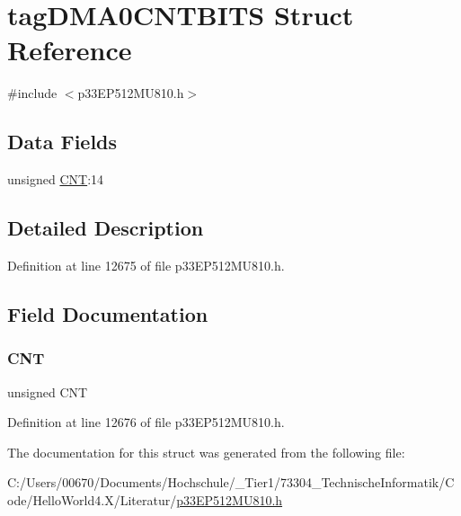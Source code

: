 \hypertarget{structtag_d_m_a0_c_n_t_b_i_t_s}{}\section{tag\+D\+M\+A0\+C\+N\+T\+B\+I\+TS Struct Reference}
\label{structtag_d_m_a0_c_n_t_b_i_t_s}


{\ttfamily \#include $<$p33\+E\+P512\+M\+U810.\+h$>$}

\subsection*{Data Fields}
\begin{DoxyCompactItemize}
\item 
unsigned \hyperlink{structtag_d_m_a0_c_n_t_b_i_t_s_a30be39d82c244f19fd98dd74227487f6}{C\+NT}\+:14
\end{DoxyCompactItemize}


\subsection{Detailed Description}


Definition at line 12675 of file p33\+E\+P512\+M\+U810.\+h.



\subsection{Field Documentation}
\mbox{\label{structtag_d_m_a0_c_n_t_b_i_t_s_a30be39d82c244f19fd98dd74227487f6}} 
\subsubsection{\texorpdfstring{C\+NT}{CNT}}
{\footnotesize\ttfamily unsigned C\+NT}



Definition at line 12676 of file p33\+E\+P512\+M\+U810.\+h.



The documentation for this struct was generated from the following file\+:\begin{DoxyCompactItemize}
\item 
C\+:/\+Users/00670/\+Documents/\+Hochschule/\+\_\+\+Tier1/73304\+\_\+\+Technische\+Informatik/\+Code/\+Hello\+World4.\+X/\+Literatur/\hyperlink{p33_e_p512_m_u810_8h}{p33\+E\+P512\+M\+U810.\+h}\end{DoxyCompactItemize}
